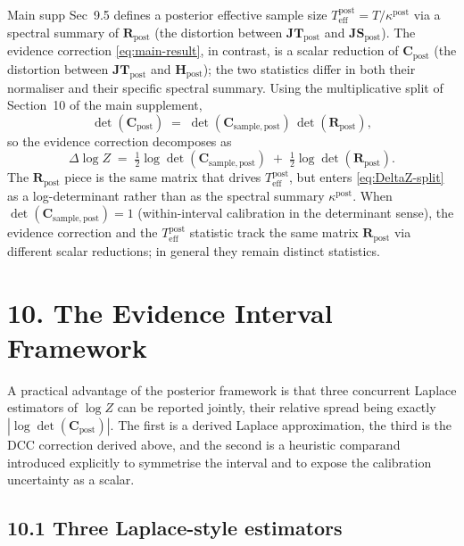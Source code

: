 \documentclass[11pt]{article}
\begin{document}
Main supp Sec~9.5 defines a posterior effective sample size $T_{\mathrm{eff}}^{\mathrm{post}} = T/\kappa^{\mathrm{post}}$
via a spectral summary of $\mathbf R_{\mathrm{post}}$ (the distortion between $\mathbf{JT}_{\mathrm{post}}$
and $\mathbf{JS}_{\mathrm{post}}$). The evidence correction \eqref{eq:main-result}, in
contrast, is a scalar reduction of $\mathbf C_{\mathrm{post}}$ (the distortion between
$\mathbf{JT}_{\mathrm{post}}$ and $\mathbf H_{\mathrm{post}}$); the two statistics differ
in both their normaliser and their specific spectral summary. Using the multiplicative
split of Section~10 of the main supplement,
\begin{equation}
\det(\mathbf C_{\mathrm{post}})
\;=\;
\det(\mathbf C_{\mathrm{sample},\mathrm{post}})\,\det(\mathbf R_{\mathrm{post}}),
\label{eq:det-split}
\end{equation}
so the evidence correction decomposes as
\begin{equation}
\Delta\log Z
\;=\;
\tfrac{1}{2}\log\det(\mathbf C_{\mathrm{sample},\mathrm{post}})
\;+\;
\tfrac{1}{2}\log\det(\mathbf R_{\mathrm{post}}).
\label{eq:DeltaZ-split}
\end{equation}
The $\mathbf R_{\mathrm{post}}$ piece is the same matrix that drives
$T_{\mathrm{eff}}^{\mathrm{post}}$, but enters \eqref{eq:DeltaZ-split} as a log-determinant
rather than as the spectral summary $\kappa^{\mathrm{post}}$. When $\det(\mathbf C_{\mathrm{sample},\mathrm{post}}) = 1$
(within-interval calibration in the determinant sense), the evidence correction and the
$T_{\mathrm{eff}}^{\mathrm{post}}$ statistic track the same matrix $\mathbf R_{\mathrm{post}}$
via different scalar reductions; in general they remain distinct statistics.

\section*{10. The Evidence Interval Framework}

A practical advantage of the posterior framework is that three concurrent Laplace
estimators of $\log Z$ can be reported jointly, their relative spread being exactly
$|\log\det(\mathbf C_{\mathrm{post}})|$. The first is a derived Laplace approximation,
the third is the DCC correction derived above, and the second is a heuristic comparand
introduced explicitly to symmetrise the interval and to expose the calibration uncertainty
as a scalar.

\subsection*{10.1 Three Laplace-style estimators}
\end{document}
